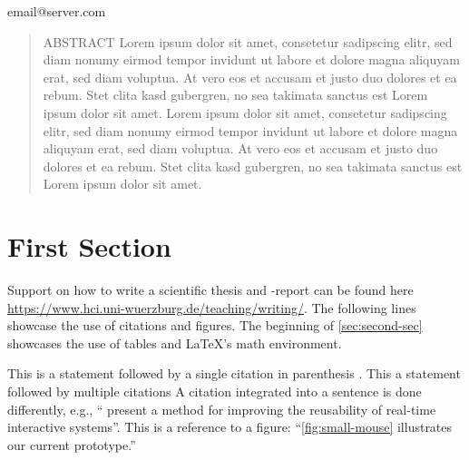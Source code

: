\documentclass[american]{acmtog} %
\begin{document}

\maketitle



\begin{bottomstuff}
email@server.com
\end{bottomstuff}


\begin{abstract}
ABSTRACT Lorem ipsum dolor sit amet, consetetur sadipscing elitr, sed diam nonumy eirmod tempor invidunt ut labore et dolore magna aliquyam erat, sed diam voluptua. At vero eos et accusam et justo duo dolores et ea rebum. Stet clita kasd gubergren, no sea takimata sanctus est Lorem ipsum dolor sit amet. Lorem ipsum dolor sit amet, consetetur sadipscing elitr, sed diam nonumy eirmod tempor invidunt ut labore et dolore magna aliquyam erat, sed diam voluptua. At vero eos et accusam et justo duo dolores et ea rebum. Stet clita kasd gubergren, no sea takimata sanctus est Lorem ipsum dolor sit amet.
\end{abstract}



\section{First Section}
\label{sec:first-sec}

Support on how to write a scientific thesis and -report can be found here \url{https://www.hci.uni-wuerzburg.de/teaching/writing/}.
The following lines showcase the use of citations and figures.
The beginning of \autoref{sec:second-sec} showcases the use of tables and {\LaTeX}'s math environment.

This is a statement followed by a single citation in parenthesis \parencite{fischbach:2012a}.
This a statement followed by multiple citations \parencite{latoschik:2012a,latoschik:2011,fischbach:2011,Rehfeld:2010,wiebusch:2010,latoschik:2010}
A citation integrated into a sentence is done differently, e.g., ``\textcite{wiebusch:2012a} present a method for improving the reusability of real-time interactive systems''.
This is a reference to a figure: ``\autoref{fig:small-mouse} illustrates our current prototype.''
\end{document}
